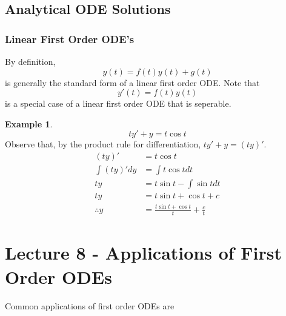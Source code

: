 \documentclass[a6paper]{article}
\theoremstyle{definition}
\newtheorem{example}{Example}
\theoremstyle{plain}
\theoremstyle{remark}
\begin{document}
\subsection{Analytical ODE Solutions}
\subsubsection{Linear First Order ODE's}
By definition,
\[y(t) = f(t)y(t) + g(t)\]
is generally the standard form of a linear first order ODE. Note that 
\[y'(t) = f(t)y(t)\]
is a special case of a linear first order ODE that is seperable.

\begin{example}
      \[ty' + y = t\cos t\]
      Observe that, by the product rule for differentiation, \(ty' + y = (ty)'\).
      \begin{align*}
            (ty)' &= t\cos t\\
            \int (ty)' dy &= \int t \cos t dt\\ 
            ty &= t\sin t - \int \sin t dt \\
            ty &= t\sin t + \cos t + c\\
            \therefore y &= \frac{t\sin t + \cos t}{t} + \frac{c}{t}
      \end{align*}

      
\end{example}

\section{Lecture 8 - Applications of First Order ODEs}
Common applications of first order ODEs are
\end{document}
